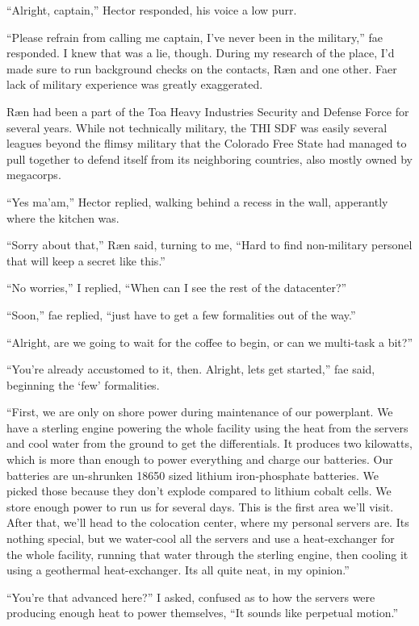 ``Alright, captain,'' Hector responded, his voice a low purr.

``Please refrain from calling me captain, I've never been in the military,'' fae responded.  I knew that was a lie, though.  During my research of the place, I'd made sure to run background checks on the contacts, Ræn and one other.  Faer lack of military experience was greatly exaggerated.

Ræn had been a part of the Toa Heavy Industries Security and Defense Force for several years.  While not technically military, the THI SDF was easily several leagues beyond the flimsy military that the Colorado Free State had managed to pull together to defend itself from its neighboring countries, also mostly owned by megacorps.

``Yes ma'am,'' Hector replied, walking behind a recess in the wall, apperantly where the kitchen was.

``Sorry about that,'' Ræn said, turning to me, ``Hard to find non-military personel that will keep a secret like this.''

``No worries,'' I replied, ``When can I see the rest of the datacenter?''

``Soon,'' fae replied, ``just have to get a few formalities out of the way.''

``Alright, are we going to wait for the coffee to begin, or can we multi-task a bit?''

``You're already accustomed to it, then.  Alright, lets get started,'' fae said, beginning the `few' formalities.

``First, we are only on shore power during maintenance of our powerplant.  We have a sterling engine powering the whole facility using the heat from the servers and cool water from the ground to get the differentials.  It produces two kilowatts, which is more than enough to power everything and charge our batteries.  Our batteries are un-shrunken 18650 sized lithium iron-phosphate batteries.  We picked those because they don't explode compared to lithium cobalt cells.  We store enough power to run us for several days.  This is the first area we'll visit.  After that, we'll head to the colocation center, where my personal servers are.  Its nothing special, but we water-cool all the servers and use a heat-exchanger for the whole facility, running that water through the sterling engine, then cooling it using a geothermal heat-exchanger.  Its all quite neat, in my opinion.''

``You're that advanced here?'' I asked, confused as to how the servers were producing enough heat to power themselves, ``It sounds like perpetual motion.''

